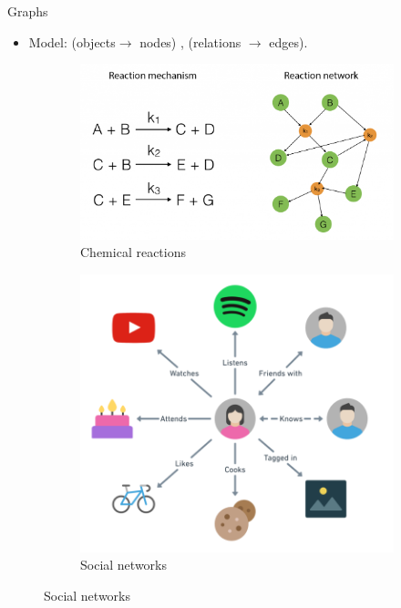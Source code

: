 \documentclass{beamer}
\begin{document}
\begin{frame}{Graphs}
    \begin{itemize}
        \item Model: (objects$\rightarrow$ nodes) , (relations $\rightarrow$ edges).
    \end{itemize}
    
\begin{figure}
     \centering
     \begin{subfigure}[b]{0.35\textwidth}
         \centering
         \includegraphics[width=\textwidth]{figs/Graph_example.png}
         \caption{Chemical reactions}
         \label{fig:y equals x}
     \end{subfigure}
     \hfill
     \begin{subfigure}[b]{0.32\textwidth}
         \centering
         \includegraphics[width=\textwidth]{figs/social_graph_example.png}
         \caption{Social networks}
         \label{fig:three sin x}
     \end{subfigure}
\end{figure}


\end{frame}
\end{document}
